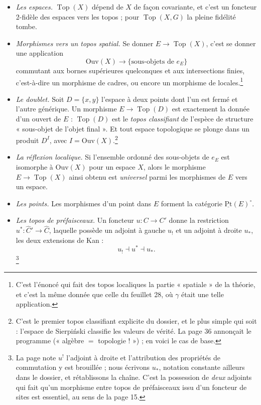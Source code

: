 \documentclass[11pt,a4paper]{article}
\begin{document}
\begin{itemize}
\item \emph{Les espaces.} $\operatorname{Top}(X)$ dépend de $X$ de façon
covariante, et c'est un foncteur 2-fidèle des espaces vers les topos ; pour
$\operatorname{Top}(X,G)$ la pleine fidélité tombe.

\item \emph{Morphismes vers un topos spatial.} Se donner $E \to
\operatorname{Top}(X)$, c'est se donner une application
\[
\mathrm{Ouv}(X) \longrightarrow \{\text{sous-objets de } e_{E}\}
\]
commutant aux bornes supérieures quelconques et aux intersections finies,
c'est-à-dire un morphisme de cadres, ou encore un morphisme de
locales.\footnote{C'est l'énoncé qui fait des topos localiques la partie
« spatiale » de la théorie, et c'est la même donnée que celle du feuillet 28,
où $\gamma$ était une telle application.}

\item \emph{Le doublet.} Soit $D = \{x,y\}$ l'espace à deux points dont l'un est
fermé et l'autre générique. Un morphisme $E \to \operatorname{Top}(D)$ est
exactement la donnée d'un ouvert de $E$ : $\operatorname{Top}(D)$ est le
\emph{topos classifiant} de l'espèce de structure « sous-objet de l'objet
final ». Et tout espace topologique se plonge dans un produit $D^{I}$, avec
$I = \mathrm{Ouv}(X)$.\footnote{C'est le premier topos classifiant explicite du
dossier, et le plus simple qui soit : l'espace de Sierpiński classifie les
valeurs de vérité. La page 36 annonçait le programme (« algèbre $=$
topologie ! ») ; en voici le cas de base.}

\item \emph{La réflexion localique.} Si l'ensemble ordonné des sous-objets de
$e_{E}$ est isomorphe à $\mathrm{Ouv}(X)$ pour un espace $X$, alors le
morphisme $E \to \operatorname{Top}(X)$ ainsi obtenu est \emph{universel} parmi
les morphismes de $E$ vers un espace.

\item \emph{Les points.} Les morphismes d'un point dans $E$ forment la
catégorie $\underline{\mathrm{Pt}}(E)^{\circ}$.

\item \emph{Les topos de préfaisceaux.} Un foncteur $u : C \to C'$ donne la
restriction $u^{*} : \widehat{C}' \to \widehat{C}$, laquelle possède un adjoint
à gauche $u_{!}$ et un adjoint à droite $u_{*}$, les deux extensions de
Kan :
\[
u_{!} \dashv u^{*} \dashv u_{*}.
\]
\footnote{La page note $u^{!}$ l'adjoint à droite et l'attribution des
propriétés de commutation y est brouillée ; nous écrivons $u_{*}$, notation
constante ailleurs dans le dossier, et rétablissons la chaîne. C'est la
possession de \emph{deux} adjoints qui fait qu'un morphisme entre topos de
préfaisceaux issu d'un foncteur de sites est essentiel, au sens de la page 15.}


\end{itemize}
\end{document}
